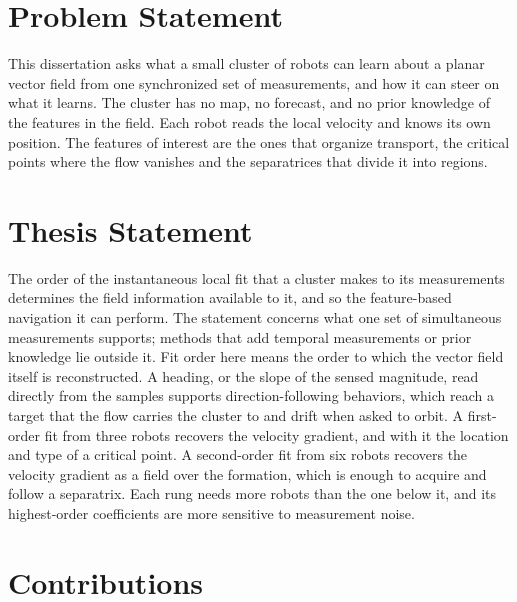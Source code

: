 \section{Problem Statement}
\label{sec:ch1:problem}

This dissertation asks what a small cluster of robots can learn about a
planar vector field from one synchronized set of measurements, and how it
can steer on what it learns. The cluster has no map, no forecast, and no
prior knowledge of the features in the field. Each robot reads the local
velocity and knows its own position. The features of interest are the
ones that organize transport, the critical points where the flow vanishes
and the separatrices that divide it into regions.

\section{Thesis Statement}
\label{sec:ch1:thesis}

The order of the instantaneous local fit that a cluster makes to its
measurements determines the field information available to it, and so the
feature-based navigation it can perform. The statement concerns what one
set of simultaneous measurements supports; methods that add temporal
measurements or prior knowledge lie outside it. Fit order here means the
order to which the vector field itself is reconstructed. A heading, or the
slope of the sensed magnitude, read directly from the samples supports
direction-following behaviors, which reach a target that the flow carries
the cluster to and drift when asked to orbit. A first-order fit from three robots recovers the velocity gradient, and
with it the location and type of a critical point. A second-order fit
from six robots recovers the velocity gradient as a field over the
formation, which is enough to acquire and follow a separatrix. Each rung
needs more robots than the one below it, and its highest-order
coefficients are more sensitive to measurement noise.

\section{Contributions}
\label{sec:ch1:contributions}

